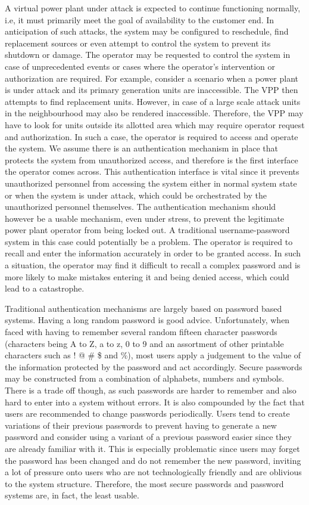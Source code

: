 A virtual power plant under attack is expected to continue functioning normally, i.e, it must primarily meet the goal of availability to the customer end. In anticipation of such attacks, the system may be configured to reschedule, find replacement sources or even attempt to control the system to prevent its shutdown or damage. The operator may be requested to control the system in case of unprecedented events or cases where the operator's intervention or authorization are required. For example, consider a scenario when a power plant is under attack and its primary generation units are inaccessible. The VPP then attempts to find replacement units. However, in case of a large scale attack units in the neighbourhood may also be rendered inaccessible. Therefore, the VPP may have to look for units outside its allotted area which may require operator request and authorization. In such a case, the operator is required to access and operate the system. We assume there is an authentication mechanism in place that protects the system from unauthorized access, and therefore is the first interface the operator comes across. This authentication interface is vital since it prevents unauthorized personnel from accessing the system either in normal system state or when the system is under attack, which could be orchestrated by the unauthorized personnel themselves. The authentication mechanism should however be a usable mechanism, even under stress, to prevent the legitimate power plant operator from being locked out. A traditional username-password system in this case could potentially be a problem. The operator is required to recall and enter the information accurately in order to be granted access. In such a situation, the operator may find it difficult to recall a complex password and is more likely to make mistakes entering it and being denied access, which could lead to a catastrophe. 

\smallskip

Traditional authentication mechanisms are largely based on password based systems. Having a long random password is good advice. Unfortunately, when faced with having to remember several random fifteen character passwords (characters being A to Z, a to z, 0 to 9 and an assortment of other printable characters such as ! @ \# \$ and \%), most users apply a judgement to the value of the information protected by the password and act accordingly. 
Secure passwords may be constructed from a combination of alphabets, numbers and symbols. There is a trade off though, as such passwords are harder to remember and also hard to enter into a system without errors. It is also compounded by the fact that users are recommended to change passwords periodically. Users tend to create variations of their previous passwords to prevent having to generate a new password and consider using a variant of a previous password easier since they are already familiar with it. This is especially problematic since users may forget the password has been changed and do not remember the new password, inviting a lot of pressure onto users who are not technologically friendly and are oblivious to the system structure. Therefore, the most secure passwords and password systems are, in fact, the least usable. 

